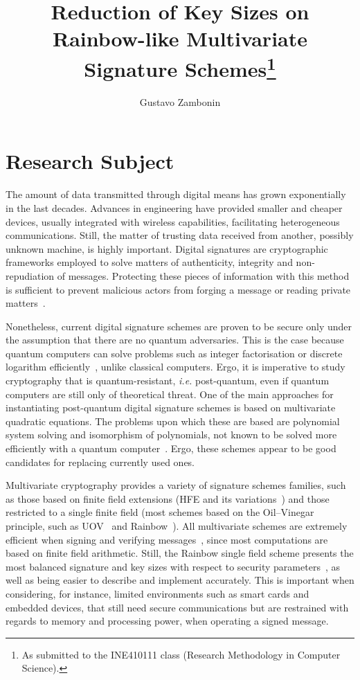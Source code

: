 \documentclass[10pt]{article}
\title{Reduction of Key Sizes on Rainbow-like Multivariate Signature Schemes\footnote{
    As submitted to the INE410111 class (Research Methodology in Computer Science).}}
\author{Gustavo Zambonin\inst{1}}
\begin{document}
 

\maketitle

\section{Research Subject}

The amount of data transmitted through digital means has grown exponentially in the last decades. Advances in engineering have provided smaller and cheaper devices, usually integrated with wireless capabilities, facilitating heterogeneous communications. Still, the matter of trusting data received from another, possibly unknown machine, is highly important. Digital signatures are cryptographic frameworks employed to solve matters of authenticity, integrity and non-repudiation of messages. Protecting these pieces of information with this method is sufficient to prevent malicious actors from forging a message or reading private matters~\cite{Goldreich:book:2004}.

Nonetheless, current digital signature schemes are proven to be secure only under the assumption that there are no quantum adversaries. This is the case because quantum computers can solve problems such as integer factorisation or discrete logarithm efficiently~\cite{Shor:article:1997:oct}, unlike classical computers. Ergo, it is imperative to study cryptography that is quantum-resistant, \emph{i.e.} post-quantum, even if quantum computers are still only of theoretical threat. One of the main approaches for instantiating post-quantum digital signature schemes is based on multivariate quadratic equations. The problems upon which these are based are polynomial system solving and isomorphism of polynomials, not known to be solved more efficiently with a quantum computer~\cite{Bernstein:book:2008}. Ergo, these schemes appear to be good candidates for replacing currently used ones.

Multivariate cryptography provides a variety of signature schemes families, such as those based on finite field extensions (HFE and its variations~\cite{Patarin:inproc:1996:may}) and those restricted to a single finite field (most schemes based on the Oil--Vinegar principle, such as UOV~\cite{Kipnis:inproc:1999:apr} and Rainbow~\cite{Ding:inproc:2005:jun}). All multivariate schemes are extremely efficient when signing and verifying messages~\cite{Ding:book:2006}, since most computations are based on finite field arithmetic. Still, the Rainbow single field scheme presents the most balanced signature and key sizes with respect to security parameters~\cite{Ding:article:2017:jul}, as well as being easier to describe and implement accurately. This is important when considering, for instance, limited environments such as smart cards and embedded devices, that still need secure communications but are restrained with regards to memory and processing power, when operating a signed message.
\end{document}
